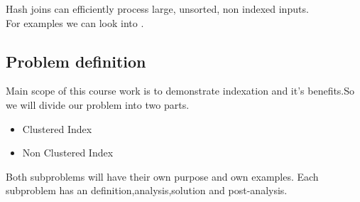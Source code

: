 Hash joins can efficiently process large, unsorted, non indexed inputs.
\\
For examples we can look into \cite{Joins}.

\subsection{Problem definition}
Main scope of this course work is to demonstrate indexation and it's benefits.So we will divide our problem into two parts.
\begin{itemize}
	\item Clustered Index
	\item Non Clustered Index
\end{itemize}
Both subproblems will have their own purpose and own examples. Each subproblem has an definition,analysis,solution and post-analysis. 

\clearpage